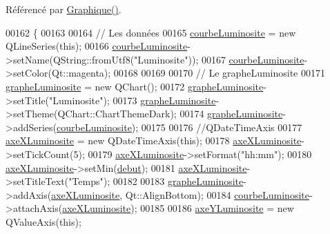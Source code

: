 Référencé par \hyperlink{class_graphique_a3aec0a5aaae78f0726771dea67af69b4}{Graphique()}.


\begin{DoxyCode}
00162 \{
00163 
00164     \textcolor{comment}{// Les données}
00165     \hyperlink{class_graphique_a8bf527363f5d8198bf6fc959a8689963}{courbeLuminosite} = \textcolor{keyword}{new} QLineSeries(\textcolor{keyword}{this});
00166     \hyperlink{class_graphique_a8bf527363f5d8198bf6fc959a8689963}{courbeLuminosite}->setName(QString::fromUtf8(\textcolor{stringliteral}{"Luminosite"}));
00167     \hyperlink{class_graphique_a8bf527363f5d8198bf6fc959a8689963}{courbeLuminosite}->setColor(Qt::magenta);
00168 
00169 
00170     \textcolor{comment}{// Le grapheLuminosite}
00171     \hyperlink{class_graphique_adbed6be47df503c9a260586b0d93f5c4}{grapheLuminosite} = \textcolor{keyword}{new} QChart();
00172     \hyperlink{class_graphique_adbed6be47df503c9a260586b0d93f5c4}{grapheLuminosite}->setTitle(\textcolor{stringliteral}{"Luminosite"});
00173     \hyperlink{class_graphique_adbed6be47df503c9a260586b0d93f5c4}{grapheLuminosite}->setTheme(QChart::ChartThemeDark);
00174     \hyperlink{class_graphique_adbed6be47df503c9a260586b0d93f5c4}{grapheLuminosite}->addSeries(\hyperlink{class_graphique_a8bf527363f5d8198bf6fc959a8689963}{courbeLuminosite});
00175 
00176     \textcolor{comment}{//QDateTimeAxis}
00177     \hyperlink{class_graphique_ae4daff72419cbb9e49209f931e79a83b}{axeXLuminosite} = \textcolor{keyword}{new} QDateTimeAxis(\textcolor{keyword}{this});
00178     \hyperlink{class_graphique_ae4daff72419cbb9e49209f931e79a83b}{axeXLuminosite}->setTickCount(5);
00179     \hyperlink{class_graphique_ae4daff72419cbb9e49209f931e79a83b}{axeXLuminosite}->setFormat(\textcolor{stringliteral}{"hh:mm"});
00180     \hyperlink{class_graphique_ae4daff72419cbb9e49209f931e79a83b}{axeXLuminosite}->setMin(\hyperlink{class_graphique_a468d57ae7b14b46558cf25629cced7b6}{debut});
00181     \hyperlink{class_graphique_ae4daff72419cbb9e49209f931e79a83b}{axeXLuminosite}->setTitleText(\textcolor{stringliteral}{"Temps"});
00182 
00183     \hyperlink{class_graphique_adbed6be47df503c9a260586b0d93f5c4}{grapheLuminosite}->addAxis(\hyperlink{class_graphique_ae4daff72419cbb9e49209f931e79a83b}{axeXLuminosite}, Qt::AlignBottom);
00184     \hyperlink{class_graphique_a8bf527363f5d8198bf6fc959a8689963}{courbeLuminosite}->attachAxis(\hyperlink{class_graphique_ae4daff72419cbb9e49209f931e79a83b}{axeXLuminosite});
00185 
00186     \hyperlink{class_graphique_a275865e638fd7cb5183d29d8b1a3624e}{axeYLuminosite} = \textcolor{keyword}{new} QValueAxis(\textcolor{keyword}{this});

\end{DoxyCode}

